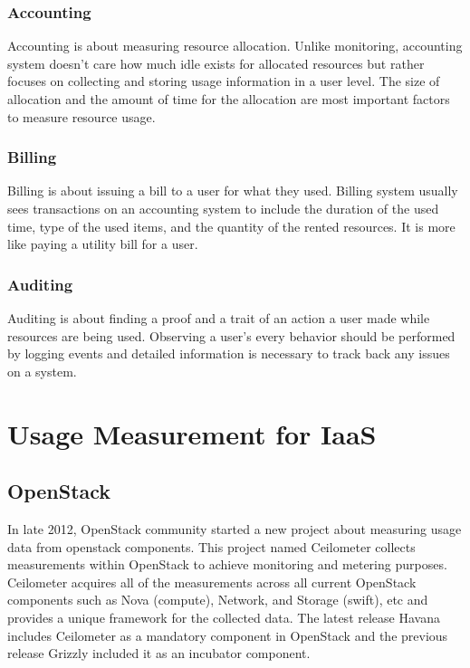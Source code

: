 \documentclass{sig-alternate}
\begin{document}
\subsubsection{Accounting}

Accounting is about measuring resource allocation. Unlike monitoring, accounting system doesn't care how much idle exists for allocated resources but rather focuses on collecting and storing usage information in a user level. The size of allocation and the amount of time for the allocation are most important factors to measure resource usage. 

\subsubsection{Billing}

Billing is about issuing a bill to a user for what they used. Billing system usually sees transactions on an accounting system to include the duration of the used time, type of the used items, and the quantity of the rented resources. It is more like paying a utility bill for a user. 

\subsubsection{Auditing}

Auditing is about finding a proof and a trait of an action a user made while resources are being used. Observing a user's every behavior should be performed by logging events and detailed information is necessary to track back any issues on a system. 

\section{Usage Measurement for IaaS}

\subsection{OpenStack}

In late 2012, OpenStack community started a new project about measuring usage data from openstack components. This project named Ceilometer collects measurements within OpenStack to achieve monitoring and metering purposes. Ceilometer acquires all of the measurements across all current OpenStack components such as Nova (compute), Network, and Storage (swift), etc and provides a unique framework for the collected data. The latest release Havana includes Ceilometer as a mandatory component in OpenStack and the previous release Grizzly included it as an incubator component.
\end{document}
